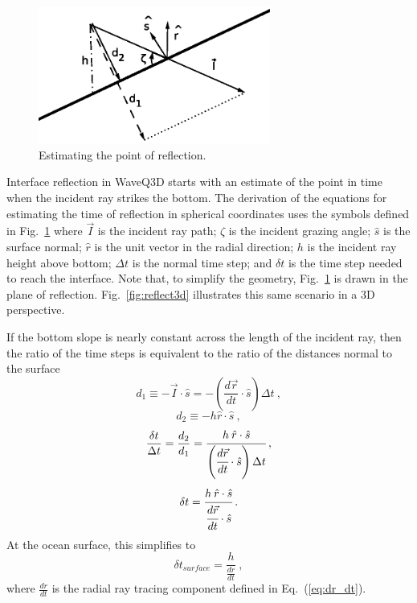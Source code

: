 \documentclass{ws-jca}
\newcommand{\threeD}{3\nobreakdash\textendash D }	%
\begin{document}
\begin{figure}[th]
	\centerline{\includegraphics[width=3in]{EstPointCollision.eps}} 
	\vspace*{8pt}
	\caption{Estimating the point of reflection. }
	\label{fig:reflection_time}
\end{figure}

Interface reflection in WaveQ3D starts with an estimate of the point in time when the incident ray strikes the bottom.  The derivation of the equations for estimating the time of reflection in spherical coordinates uses the symbols defined in Fig.~\ref{fig:reflection_time} where
\(\vec{I}\) is the incident ray path;
\(\zeta\) is the incident grazing angle;
\(\hat{s}\) is the surface normal;
\(\hat{r}\) is the unit vector in the radial direction;
\(h\) is the incident ray height above bottom;
\(\Delta t\) is the normal time step; and
\(\delta t\) is the time step needed to reach the interface.  
Note that, to simplify the geometry, Fig.~\ref{fig:reflection_time} is drawn in the plane of reflection.   Fig.~\ref{fig:reflect3d} illustrates this same scenario in a \threeD perspective.

If the bottom slope is nearly constant across the length of the incident
ray, then the ratio of the time steps is equivalent to the ratio of the
distances normal to the surface
\begin{equation}
	d_1 \equiv - \vec{I} \cdot \hat{s} 
		= - \left( \frac{d\vec{r}}{dt} \cdot \hat{s} \right) \Delta t \:,
	\label{eq:reflection_d1}
\end{equation}
\begin{equation}
	d_2 \equiv - h \hat{r} \cdot \hat{s} \:,
	\label{eq:reflection_d2}
\end{equation}
\begin{equation}
	\frac{\delta t}{\Delta t} = \frac{d_2}{d_1} 
		= \cfrac{h \: \hat{r} \cdot \hat{s}}{\left( \cfrac{d\vec{r}}{dt} 
		\cdot \hat{s} \right) \Delta t} \:,
	\label{eq:reflection_ratio}
\end{equation}
\begin{equation}
	\delta t = \cfrac{h \: \hat{r} \cdot \hat{s}}{\cfrac{d\vec{r}}{dt} \cdot \hat{s}} \:.
	\label{eq:reflection_time_bottom}
\end{equation}
At the ocean surface, this simplifies to
\begin{equation}
	\delta t_{surface} = \frac{h}{\frac{dr}{dt}} \:,
	\label{eq:reflection_time_surface}
\end{equation}
where \(\frac{dr}{dt}\) is the radial ray tracing component defined in
Eq.~(\ref{eq:dr_dt}).
\end{document}
